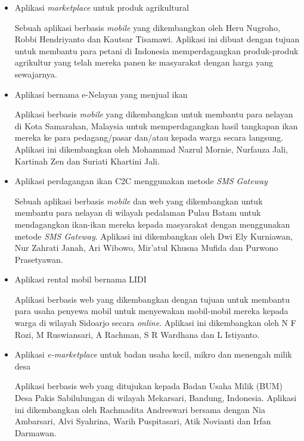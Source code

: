 \documentclass[a4paper]{article}
\begin{document}
\begin{itemize}
    \item Aplikasi \textit{marketplace} untuk produk agrikultural
    
    Sebuah aplikasi berbasis \textit{mobile} yang dikembangkan oleh Heru Nugroho, Robbi Hendriyanto dan Kautsar Tisamawi. Aplikasi ini dibuat dengan tujuan untuk membantu para petani di Indonesia memperdagangkan produk-produk agrikultur yang telah mereka panen ke masyarakat dengan harga yang sewajarnya\autocite{agriculture-marketplace}. 

    \item Aplikasi bernama e-Nelayan yang menjual ikan
    
    Aplikasi berbasis \textit{mobile} yang dikembangkan untuk membantu para nelayan di Kota Samarahan, Malaysia untuk memperdagangkan hasil tangkapan ikan mereka ke para pedagang/pasar dan/atau kepada warga secara langsung. Aplikasi ini dikembangkan oleh Mohammad Nazrul Mornie, Nurfauza Jali, Kartinah Zen dan Suriati Khartini Jali\autocite[1-10]{fishes-marketplace}.

    \item Aplikasi perdagangan ikan C2C menggunakan metode \textit{SMS Gateway}
    
    Sebuah aplikasi berbasis \textit{mobile} dan web yang dikembangkan untuk membantu para nelayan di wilayah pedalaman Pulau Batam untuk mendagangkan ikan-ikan mereka kepada masyarakat dengan menggunakan metode \textit{SMS Gateway}. Aplikasi ini dikembangkan oleh Dwi Ely Kurniawan, Nur Zahrati Janah, Ari Wibowo, Mir'atul Khusna Mufida dan Purwono Prasetyawan\autocite{c2c-fish-marketplace}.

    \item Aplikasi rental mobil bernama LIDI
    
    Aplikasi berbasis web yang dikembangkan dengan tujuan untuk membantu para usaha penyewa mobil untuk menyewakan mobil-mobil mereka kepada warga di wilayah Sidoarjo secara \textit{online}. Aplikasi ini dikembangkan oleh N F Rozi, M Ruswiansari, A Rachman, S R Wardhana dan L Istiyanto\autocite{lidi-car-rental}. 

    \item Aplikasi \textit{e-marketplace} untuk badan usaha kecil, mikro dan menengah milik desa
    
    Aplikasi berbasis web yang ditujukan kepada Badan Usaha Milik (BUM) Desa Pakis Sabilulungan di wilayah Mekarsari, Bandung, Indonesia. Aplikasi ini dikembangkan oleh Rachmadita Andreswari bersama dengan Nia Ambarsari, Alvi Syahrina, Warih Puspitasari, Atik Novianti dan Irfan Darmawan\autocite{bum-mekarsari}.

\end{itemize}
\end{document}
